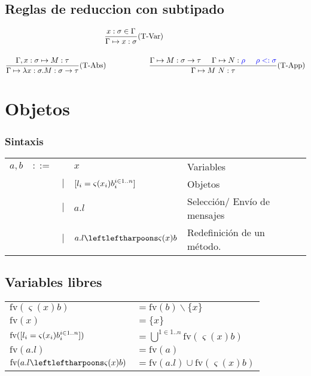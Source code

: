 \documentclass[10pt,a4paper]{article}
\begin{document}
\subsection{Reglas de reduccion con subtipado}

\begin{equation*}
\begin{gathered}
    \frac{x:\sigma\in\Gamma}{\judgeTypeS{\Gamma}{x}{\sigma}}(\text{T-Var})\hspace*{2cm}
\vspace*{5mm} \\
    \frac {\judgeTypeS{\Gamma,x:\sigma}{M}{\tau}}
          {\judgeTypeS{\Gamma}{\lambdaAbs{x}{\sigma}{M}}{\sigma\to\tau}}(\text{T-Abs})\hspace*{2cm}
    \frac{\judgeTypeS{\Gamma}{M}{\sigma\to\tau}\hspace*{5mm}\judgeTypeS{\Gamma}{N}{\blue{\rho}}\hspace*{5mm}\blue{\rho <: \sigma}}{\judgeTypeS{\Gamma}{M~N}{\tau}}(\text{T-App})
\end{gathered}
\end{equation*}

\newpage
\section{Objetos}
\subsubsection{Sintaxis}
\begin{tabular}{lllll}
	$a,b$ &$::=$& &$x$ & Variables \\
 	      &     & $|$ &$[l_i = \varsigma(x_i)b_i^{i\in1..n}]$ &  Objetos\\
 	      &     & $|$ &$a.l$ &  Selección/ Envío de mensajes \\
 	      &     & $|$ &$\OORedefinicion{a.l}{x}{b}$ &  Redefinición de un método.	       	       	      
\end{tabular}

\subsection{Variables libres}
\begin{tabular}{ll}
	$\text{fv}(\varsigma(x)b)$ &$= \text{fv}(b)\backslash \{x\} $\\
	$\text{fv}(x)$ &$= \{x\} $\\
	$\text{fv}([l_i = \varsigma(x_i)b_i^{i\in 1..n}])$ &$=  \bigcup^{1\in 1..n} \text{fv}(\varsigma(x)b)$\\
	$\text{fv}(a.l)$ &$= \text{fv}(a) $\\
	$\text{fv}(\OORedefinicion{a.l}{x}{b})$ &$= \text{fv}(a.l)\cup \text{fv}(\varsigma(x)b) $\\
\end{tabular}
\end{document}
